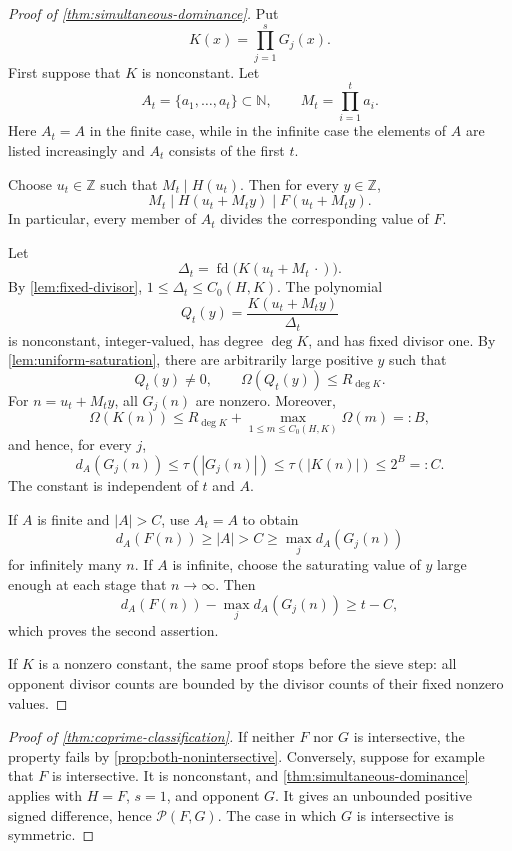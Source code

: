 \documentclass[11pt]{amsart}
\newcommand{\N}{\mathbb N}
\newcommand{\Z}{\mathbb Z}
\newcommand{\cP}{\mathcal P}
\newcommand{\fd}{\operatorname{fd}}
\theoremstyle{definition}
\begin{document}
\begin{proof}[Proof of \cref{thm:simultaneous-dominance}]
Put
\[
  K(x)=\prod_{j=1}^sG_j(x).
\]
First suppose that \(K\) is nonconstant.  Let
\[
  A_t=\{a_1,\ldots,a_t\}\subset\N,\qquad
  M_t=\prod_{i=1}^t a_i.
\]
Here \(A_t=A\) in the finite case, while in the infinite case the elements
of \(A\) are listed increasingly and \(A_t\) consists of the first \(t\).

Choose \(u_t\in\Z\) such that \(M_t\mid H(u_t)\).  Then for every
\(y\in\Z\),
\[
  M_t\mid H(u_t+M_ty)\mid F(u_t+M_ty).
\]
In particular, every member of \(A_t\) divides the corresponding value of
\(F\).

Let
\[
  \Delta_t=\fd\bigl(K(u_t+M_t\,\cdot)\bigr).
\]
By \cref{lem:fixed-divisor}, \(1\le\Delta_t\le C_0(H,K)\).  The polynomial
\[
  Q_t(y)=\frac{K(u_t+M_ty)}{\Delta_t}
\]
is nonconstant, integer-valued, has degree \(\deg K\), and has fixed divisor
one.  By \cref{lem:uniform-saturation}, there are arbitrarily large positive
\(y\) such that
\[
  Q_t(y)\ne0,\qquad \Omega(Q_t(y))\le R_{\deg K}.
\]
For \(n=u_t+M_ty\), all \(G_j(n)\) are nonzero.  Moreover,
\[
  \Omega(K(n))
  \le R_{\deg K}+
  \max_{1\le m\le C_0(H,K)}\Omega(m)=:B,
\]
and hence, for every \(j\),
\begin{equation}\label{eq:opponent-bound}
  d_A(G_j(n))
  \le\tau(|G_j(n)|)
  \le\tau(|K(n)|)
  \le2^B=:C.
\end{equation}
The constant is independent of \(t\) and \(A\).

If \(A\) is finite and \(|A|>C\), use \(A_t=A\) to obtain
\[
  d_A(F(n))\ge|A|>C\ge\max_jd_A(G_j(n))
\]
for infinitely many \(n\).  If \(A\) is infinite, choose the saturating
value of \(y\) large enough at each stage that \(n\to\infty\).  Then
\[
  d_A(F(n))-\max_jd_A(G_j(n))\ge t-C,
\]
which proves the second assertion.

If \(K\) is a nonzero constant, the same proof stops before the sieve step:
all opponent divisor counts are bounded by the divisor counts of their fixed
nonzero values.
\end{proof}

\begin{proof}[Proof of \cref{thm:coprime-classification}]
If neither \(F\) nor \(G\) is intersective, the property fails by
\cref{prop:both-nonintersective}.  Conversely, suppose for example that
\(F\) is intersective.  It is nonconstant, and
\cref{thm:simultaneous-dominance} applies with \(H=F\), \(s=1\), and
opponent \(G\).  It gives an unbounded positive signed difference, hence
\(\cP(F,G)\).  The case in which \(G\) is intersective is symmetric.
\end{proof}
\end{document}
